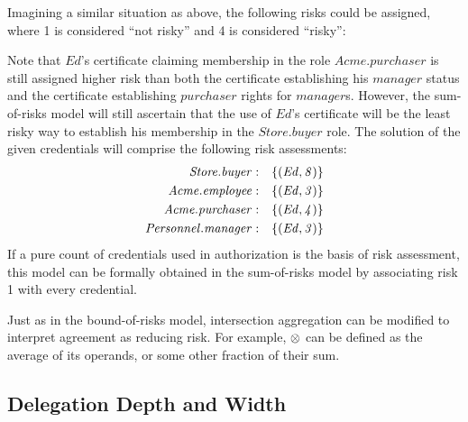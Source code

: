 Imagining a similar situation as above, the following risks could 
be assigned, where 1 is considered ``not risky'' and 4 is considered
``risky'':
\begin{mathpar}




\end{mathpar}
Note that $\mathit{Ed}$'s certificate claiming membership in the role
$\mathit{Acme.purchaser}$ is still assigned higher risk than both
the certificate establishing his $\mathit{manager}$ status and the
certificate establishing $\mathit{purchaser}$ rights for
$\mathit{manager}$s.  However, the sum-of-risks model will still
ascertain that the use of $\mathit{Ed}$'s certificate will be the least
risky way to establish his membership in the $\mathit{Store.buyer}$
role.  The solution of the given credentials will comprise the following
risk assessments:
\begin{eqnarray*}
\mathit{Store.buyer}&:& \setdefn{(\mathit{Ed, 8})}\\
\mathit{Acme.employee}&:& \setdefn{(\mathit{Ed, 3})}\\
\mathit{Acme.purchaser}&:& \setdefn{(\mathit{Ed, 4})}\\
\mathit{Personnel.manager}&:& \setdefn{(\mathit{Ed, 3})}
\end{eqnarray*}
If a pure count of credentials used in authorization is the 
basis of risk assessment, this model can be formally obtained 
in the sum-of-risks model by associating risk 1 with every 
credential.

Just as in the bound-of-risks model, intersection aggregation can be
modified to interpret agreement as reducing risk.  For example,
$\isectplus$ can be defined as the average of its operands, or some
other fraction of their sum.

\subsection{Delegation Depth and Width}

